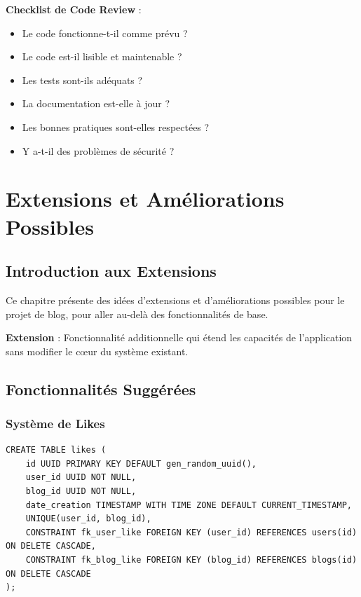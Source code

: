 \begin{bestpracticebox}
    \textbf{Checklist de Code Review} :
    \begin{itemize}
        \item Le code fonctionne-t-il comme prévu ?
        \item Le code est-il lisible et maintenable ?
        \item Les tests sont-ils adéquats ?
        \item La documentation est-elle à jour ?
        \item Les bonnes pratiques sont-elles respectées ?
        \item Y a-t-il des problèmes de sécurité ?
    \end{itemize}
\end{bestpracticebox}

\chapter{Extensions et Améliorations Possibles}

\section{Introduction aux Extensions}

Ce chapitre présente des idées d'extensions et d'améliorations possibles pour le projet de blog, pour aller au-delà des fonctionnalités de base.

\begin{definitionbox}
    \textbf{Extension} : Fonctionnalité additionnelle qui étend les capacités de l'application sans modifier le cœur du système existant.
\end{definitionbox}

\section{Fonctionnalités Suggérées}

\subsection{Système de Likes}

\begin{lstlisting}[style=sql, caption=Table des likes]
CREATE TABLE likes (
    id UUID PRIMARY KEY DEFAULT gen_random_uuid(),
    user_id UUID NOT NULL,
    blog_id UUID NOT NULL,
    date_creation TIMESTAMP WITH TIME ZONE DEFAULT CURRENT_TIMESTAMP,
    UNIQUE(user_id, blog_id),
    CONSTRAINT fk_user_like FOREIGN KEY (user_id) REFERENCES users(id) ON DELETE CASCADE,
    CONSTRAINT fk_blog_like FOREIGN KEY (blog_id) REFERENCES blogs(id) ON DELETE CASCADE
);
\end{lstlisting}

